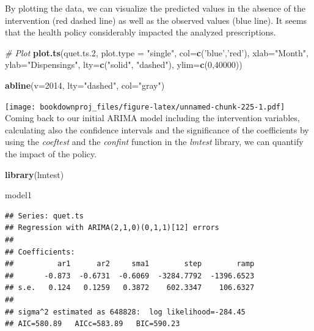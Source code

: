 \documentclass[
]{article}
\newenvironment{Shaded}{\begin{snugshade}}{\end{snugshade}}
\newcommand{\CommentTok}[1]{\textcolor[rgb]{0.56,0.35,0.01}{\textit{#1}}}
\newcommand{\DataTypeTok}[1]{\textcolor[rgb]{0.13,0.29,0.53}{#1}}
\newcommand{\DecValTok}[1]{\textcolor[rgb]{0.00,0.00,0.81}{#1}}
\newcommand{\FloatTok}[1]{\textcolor[rgb]{0.00,0.00,0.81}{#1}}
\newcommand{\KeywordTok}[1]{\textcolor[rgb]{0.13,0.29,0.53}{\textbf{#1}}}
\newcommand{\NormalTok}[1]{#1}
\newcommand{\StringTok}[1]{\textcolor[rgb]{0.31,0.60,0.02}{#1}}
\begin{document}
By plotting the data, we can visualize the predicted values in the absence of the intervention (red dashed line) as well as the observed values (blue line). It seems that the health policy considerably impacted the analyzed prescriptions.

\begin{Shaded}
\begin{Highlighting}[]
\CommentTok{# Plot}
\KeywordTok{plot.ts}\NormalTok{(quet.ts}\FloatTok{.2}\NormalTok{, }\DataTypeTok{plot.type =} \StringTok{"single"}\NormalTok{, }
     \DataTypeTok{col=}\KeywordTok{c}\NormalTok{(}\StringTok{'blue'}\NormalTok{,}\StringTok{'red'}\NormalTok{), }\DataTypeTok{xlab=}\StringTok{"Month"}\NormalTok{, }\DataTypeTok{ylab=}\StringTok{"Dispensings"}\NormalTok{, }
     \DataTypeTok{lty=}\KeywordTok{c}\NormalTok{(}\StringTok{"solid"}\NormalTok{, }\StringTok{"dashed"}\NormalTok{), }\DataTypeTok{ylim=}\KeywordTok{c}\NormalTok{(}\DecValTok{0}\NormalTok{,}\DecValTok{40000}\NormalTok{))}

\KeywordTok{abline}\NormalTok{(}\DataTypeTok{v=}\DecValTok{2014}\NormalTok{, }\DataTypeTok{lty=}\StringTok{"dashed"}\NormalTok{, }\DataTypeTok{col=}\StringTok{"gray"}\NormalTok{)}
\end{Highlighting}
\end{Shaded}

\texttt{[image: bookdownproj\_files/figure-latex/unnamed-chunk-225-1.pdf]}
Coming back to our initial ARIMA model including the intervention variables, calculating also the confidence intervals and the significance of the coefficients by using the \emph{coeftest} and the \emph{confint} function in the \emph{lmtest} library, we can quantify the impact of the policy.

\begin{Shaded}
\begin{Highlighting}[]
\KeywordTok{library}\NormalTok{(lmtest)}

\NormalTok{model1}
\end{Highlighting}
\end{Shaded}

\begin{verbatim}
## Series: quet.ts 
## Regression with ARIMA(2,1,0)(0,1,1)[12] errors 
## 
## Coefficients:
##          ar1      ar2     sma1        step        ramp
##       -0.873  -0.6731  -0.6069  -3284.7792  -1396.6523
## s.e.   0.124   0.1259   0.3872    602.3347    106.6327
## 
## sigma^2 estimated as 648828:  log likelihood=-284.45
## AIC=580.89   AICc=583.89   BIC=590.23
\end{verbatim}
\end{document}
